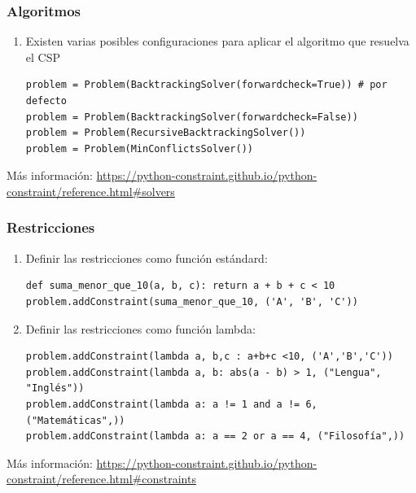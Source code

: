 \documentclass[xcolor=table]{beamer}
\begin{document}
\begin{frame} [fragile]\frametitle{Algoritmos } \footnotesize  

\begin{enumerate}

\item Existen varias posibles configuraciones para aplicar el algoritmo que resuelva el CSP

\begin{verbatim}
problem = Problem(BacktrackingSolver(forwardcheck=True)) # por defecto
problem = Problem(BacktrackingSolver(forwardcheck=False))
problem = Problem(RecursiveBacktrackingSolver())
problem = Problem(MinConflictsSolver())
\end{verbatim}
 
\end{enumerate}

\scriptsize
Más información: 
\url{https://python-constraint.github.io/python-constraint/reference.html#solvers}
\end{frame} 
\begin{frame} [fragile]\frametitle{Restricciones } \footnotesize  

\begin{enumerate}

\item Definir las restricciones como función estándard:

\begin{verbatim}
def suma_menor_que_10(a, b, c): return a + b + c < 10
problem.addConstraint(suma_menor_que_10, ('A', 'B', 'C'))
\end{verbatim}
 
\item  Definir las restricciones como función lambda:
\begin{verbatim}
problem.addConstraint(lambda a, b,c : a+b+c <10, ('A','B','C')) 
problem.addConstraint(lambda a, b: abs(a - b) > 1, ("Lengua", "Inglés"))
problem.addConstraint(lambda a: a != 1 and a != 6, ("Matemáticas",))
problem.addConstraint(lambda a: a == 2 or a == 4, ("Filosofía",))

\end{verbatim}
\end{enumerate}

\scriptsize
Más información: 
\url{https://python-constraint.github.io/python-constraint/reference.html#constraints}
\end{frame} 
\end{document}
